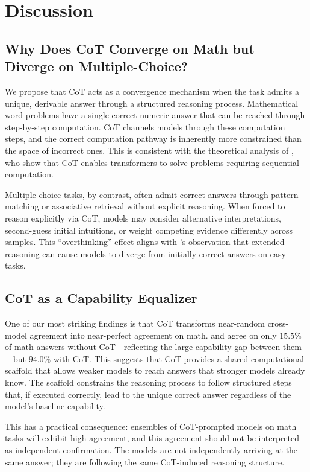 \section{Discussion}
\label{sec:discussion}

\subsection{Why Does CoT Converge on Math but Diverge on Multiple-Choice?}

We propose that CoT acts as a convergence mechanism when the task admits a unique, derivable answer through a structured reasoning process. Mathematical word problems have a single correct numeric answer that can be reached through step-by-step computation. CoT channels models through these computation steps, and the correct computation pathway is inherently more constrained than the space of incorrect ones. This is consistent with the theoretical analysis of \citet{feng2023towards}, who show that CoT enables transformers to solve problems requiring sequential computation.

Multiple-choice tasks, by contrast, often admit correct answers through pattern matching or associative retrieval without explicit reasoning. When forced to reason explicitly via CoT, models may consider alternative interpretations, second-guess initial intuitions, or weight competing evidence differently across samples. This ``overthinking'' effect aligns with \citet{liu2025answer}'s observation that extended reasoning can cause models to diverge from initially correct answers on easy tasks.

\subsection{CoT as a Capability Equalizer}

One of our most striking findings is that CoT transforms near-random cross-model agreement into near-perfect agreement on math. \gptmini and \gptnano agree on only $15.5\%$ of math answers without CoT---reflecting the large capability gap between them---but $94.0\%$ with CoT. This suggests that CoT provides a shared computational scaffold that allows weaker models to reach answers that stronger models already know. The scaffold constrains the reasoning process to follow structured steps that, if executed correctly, lead to the unique correct answer regardless of the model's baseline capability.

This has a practical consequence: ensembles of CoT-prompted models on math tasks will exhibit high agreement, and this agreement should not be interpreted as independent confirmation. The models are not independently arriving at the same answer; they are following the same CoT-induced reasoning structure.

